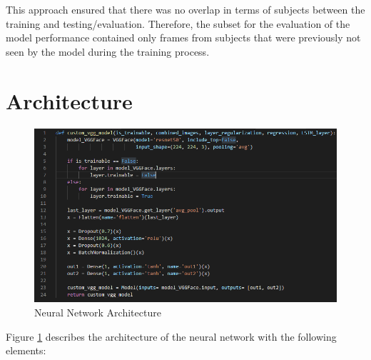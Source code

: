 This approach ensured that there was no overlap in terms of subjects between the training and testing/evaluation. Therefore, the subset for the evaluation of the model performance contained only frames from subjects that were previously not seen by the model during the training process.


\section{Architecture}

\begin{figure}[H]
  \begin{center}
  \includegraphics[angle=0, width=1.0\textwidth]{Figures/model_architecture.PNG}
  \caption{Neural Network Architecture}
  \label{fig:NNArchitecture}
  \end{center}
\end{figure}

Figure \ref{fig:NNArchitecture} describes the architecture of the neural network with the following elements:

